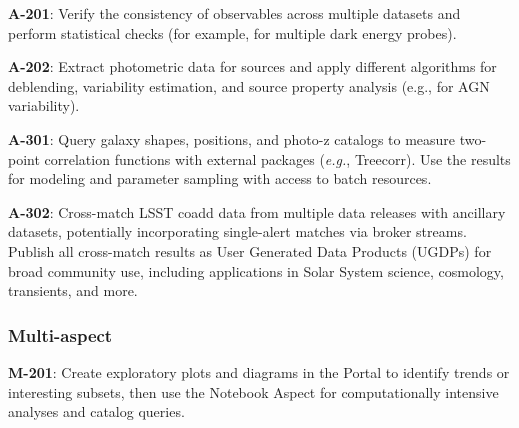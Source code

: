 \textbf{A-201}: Verify the consistency of observables across multiple datasets and perform statistical checks (for example, for multiple dark energy probes). 

\textbf{A-202}: Extract photometric data for sources and apply different algorithms for deblending, variability estimation, and source property analysis (e.g., for AGN variability). 

\textbf{A-301}: Query galaxy shapes, positions, and photo-z catalogs to measure two-point correlation functions with external packages (\emph{e.g.}, Treecorr).
Use the results for modeling and parameter sampling with access to batch resources.

\textbf{A-302}: Cross-match LSST coadd data from multiple data releases with ancillary datasets, potentially incorporating single-alert matches via broker streams.
Publish all cross-match results as User Generated Data Products (UGDPs) for broad community use, including applications in Solar System science, cosmology, transients, and more.

\subsubsection{Multi-aspect}

\textbf{M-201}: Create exploratory plots and diagrams in the Portal to identify trends or interesting subsets, then use the Notebook Aspect for computationally intensive analyses and catalog queries.
